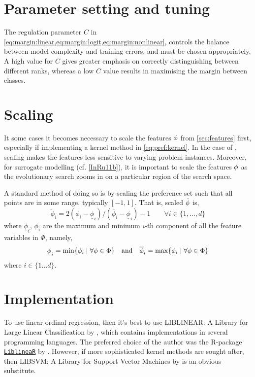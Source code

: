 \section{Parameter setting and tuning}
The regulation parameter $C$ in 
\cref{eq:margin:linear,eq:margin:logit,eq:margin:nonlinear}, 
controls the balance between model complexity and training errors, and must be 
chosen appropriately. A high value for $C$ gives greater emphasis on correctly 
distinguishing between different ranks, whereas a low $C$ value results in 
maximising the margin between classes.

\section{Scaling}\label{app:feat:scaling}
It some cases it becomes necessary to scale the features ${\mathbf{\phi}}$ from 
\cref{sec:features} first, especially if implementing a kernel method in 
\cref{eq:pref:kernel}.
In the case of \JSP, scaling makes the features less sensitive to varying 
problem instances.
Moreover, for surrogate modelling (cf. \cref{InRu11b}), it is important to 
scale the features ${\mathbf{\phi}}$ as the evolutionary search zooms in on a particular 
region of the search space. 

A standard method of doing so is by scaling the preference set such that all 
points are in some range, typically $[-1,1]$. That is, scaled $\tilde{{\mathbf{\phi}}}$ 
is,
\begin{equation}\label{eq:scale}
\tilde{\phi}_i = 2 (\phi_i - \underline{\phi}_i) / (\overline{\phi}_i - 
\underline{\phi}_i) - 1 
\quad\quad \forall i\in\{1,\ldots,d\}
\end{equation}
where $\underline{\phi}_i$, $\overline{\phi}_i$ are the maximum and minimum 
$i$-th component of all the feature variables in $\Phi$, namely,
\begin{equation}
\underline{\phi}_i=\min\{\phi_i\;|\;\forall{\mathbf{\phi}}\in \Phi\} 
\quad\textrm{and}\quad \overline{\phi}_i=\max\{\phi_i\;|\;\forall{\mathbf{\phi}}\in 
\Phi\}
\end{equation}
where $i\in\{1\ldots d\}$. 

\section{Implementation}
To use linear ordinal regression, then it's best to use LIBLINEAR: A 
Library for Large Linear Classification by \citet{main:LIBLINEAR}, which 
contains implementations in several programming languages. The preferred choice 
of the author was the R-package 
\href{https://cran.r-project.org/web/packages/LiblineaR/}{\texttt{LiblineaR}} 
by \citet{cran:LiblineaR}.
However, if more sophisticated kernel methods are sought after, then {LIBSVM}: 
A Library for Support Vector Machines by 
\citet{main:LIBSVM} is an obvious substitute.

